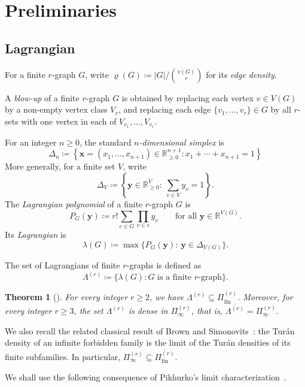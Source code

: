 \documentclass[10pt]{article}
\numberwithin{equation}{section}
\newtheorem{theorem}{Theorem}[section]
\newcommand{\R}{\mathbb{R}}
\newcommand{\fin}{\mathrm{fin}}
\begin{document}
\section{Preliminaries}
\label{sec:preliminaries}
\subsection{Lagrangian}
%
For a finite $r$-graph $G$, write $\varrho(G)\coloneqq |G|/\binom{v(G)}{r}$ for its \emph{edge density}.

A \emph{blow-up} of a finite $r$-graph $G$ is obtained by replacing each vertex $v\in V(G)$ by a non-empty vertex class $V_v$, and replacing each edge $\{v_1,\ldots,v_r\}\in G$ by all $r$-sets with one vertex in each of $V_{v_1},\ldots,V_{v_r}$.

For an integer $n\ge 0$, the standard \emph{$n$-dimensional simplex} is 
\[
        \Delta_n \coloneqq \left\{ \mathbf{x}=(x_1,\ldots,x_{n+1})\in\R_{\ge 0}^{n+1}\colon x_1 + \cdots + x_{n+1} = 1 \right\}
\]
More generally, for a finite set $V$, write
\[
        \Delta_V\coloneqq \left\{\mathbf{y}\in\R_{\ge 0}^{V}\colon\ \sum_{v\in V}y_v=1\right\}.
\]
The \emph{Lagrangian polynomial} of a finite $r$-graph $G$ is
\[
        P_G(\mathbf{y})\coloneqq r!\sum_{e\in G}\prod_{v\in e}y_v \qquad\text{for all } \mathbf{y}\in\R^{V(G)}.
\]
Its \emph{Lagrangian} is
\[
        \lambda(G)\coloneqq \max\{P_G(\mathbf{y})\colon\ \mathbf{y}\in\Delta_{V(G)}\}.
\]

The set of Lagrangians of finite $r$-graphs is defined as 
\[
        \Lambda^{(r)} \coloneqq \{\lambda(G)\colon G\text{ is a finite }r\text{-graph}\}.
\]

\begin{theorem}[{\cite[Corollary~4 and Theorem~24]{Pikhurko2014}}]\label{thm:pikhurko-lagrangian-densities} For every integer $r\ge 2$, we have $\Lambda^{(r)}\subseteq \Pi^{(r)}_{\fin}$. Moreover, for every integer $r\ge 3$, the set $\Lambda^{(r)}$ is dense in $\Pi^{(r)}_\infty$, that is, $\overline{\Lambda^{(r)}} = \Pi^{(r)}_{\infty}$. 
\end{theorem}

We also recall the related classical result of Brown and Simonovits~\cite{BrownSimonovits1984}: the Tur\'an density of an infinite forbidden family is the limit of the Tur\'an densities of its finite subfamilies. In particular, $\Pi^{(r)}_\infty\subseteq\overline{\Pi^{(r)}_{\fin}}$.

We shall use the following consequence of Pikhurko's limit characterization~\cite[Theorem 24]{Pikhurko2014}.
\end{document}
